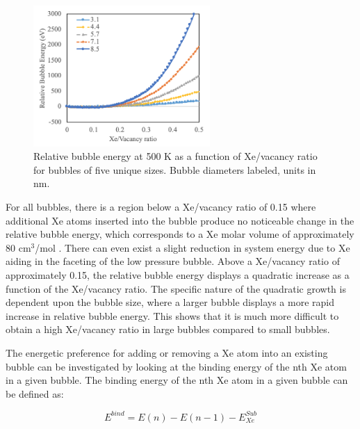\documentclass[review]{elsarticle}
\begin{document}
\begin{figure}[h]
 \centering
 \includegraphics[width=0.6\textwidth]{3_bubE.png} 
 \caption{Relative bubble energy at 500 K as a function of Xe/vacancy ratio for bubbles of five unique sizes. Bubble diameters labeled, units in nm.}
 \label{fig:bubE}
\end{figure}

For all bubbles, there is a region below a Xe/vacancy ratio of 0.15 where additional Xe atoms inserted into the bubble produce no noticeable change in the relative bubble energy, which corresponds to a Xe molar volume of approximately 80 cm$^3$/mol . There can even exist a slight reduction in system energy due to Xe aiding in the faceting of the low pressure bubble. Above a Xe/vacancy ratio of approximately 0.15, the relative bubble energy displays a quadratic increase as a function of the Xe/vacancy ratio. The specific nature of the quadratic growth is dependent upon the bubble size, where a larger bubble displays a more rapid increase in relative bubble energy. This shows that it is much more difficult to obtain a high Xe/vacancy ratio in large bubbles compared to small bubbles. 

\FloatBarrier

The energetic preference for adding or removing a Xe atom into an existing bubble can be investigated by looking at the binding energy of the nth Xe atom in a given bubble. The binding energy of the nth Xe atom in a given bubble can be defined as:

\begin{equation}
\label{eq:bind}
E^{bind}= E(n)-E(n-1) - E_{Xe}^{Sub}
\end{equation}
\end{document}
